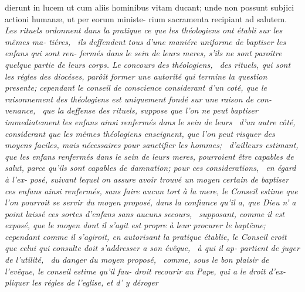 \documentclass{article}
\begin{document}
\newpage
\bgroup\fontsize{9.6}{13}\selectfont\noindent
dierunt in lucem ut cum aliis hominibus\break
vitam ducant; unde non possunt subjici\break
actioni humanæ, ut per eorum ministe-\break
rium sacramenta recipiant ad salutem.\break
\fontsize{9.6}{13}\selectfont\itshape Les rituels ordonnent dans la
pratique ce que\break
les théologiens ont établi sur les mêmes ma-\break
tiéres, \et\  ils deffendent tous d’une maniére\break
uniforme de baptiser les enfans qui sont ren-\break
fermés dans le sein de leurs meres, s’ils ne\break
sont paroître quelque partie de leurs corps.\break 
Le concours des théologiens, \et\  des rituels,\break
qui sont les régles des diocéses, parôit former\break
une autorité qui termine la question presente\textnormal{;}\break
cependant le conseil de conscience considerant\break
d’un coté, que le raisonnement des théologiens\break
est uniquement fondé sur une raison de con-\break
venance, \et\  que la deffense des rituels, suppose\break
que l’on ne peut baptiser immediatement les\break
enfans ainsi renfermés dans le sein de leurs\break
{}\break
\et\  d’un autre côté, considerant que les mêmes
théologiens enseignent, que l’on peut risquer\break
{}\break
des moyens faciles, mais nécessaires pour\break 
sanctifier les hommes; \et\  d’ailleurs estimant,\break
que les enfans renfermés dans le sein de leurs\break
meres, pourroient être capables de salut,\break
parce qu’ils sont capables de damnation\textnormal{;}\tsk\break  
pour ces considerations, \et\  en égard à l’ex-\break
posé, suivant lequel on assure avoir trouvé\break
un moyen certain de baptiser ces enfans ainsi\break
renfermés, sans faire aucun tort à la mere,\break
le Conseil estime que l’on pourroit se servir du\break
moyen proposé, dans la confiance qu’il a, que\break
Dieu n’ a point laissé ces sortes d’enfans\break
sans aucuns secours, \et\  supposant, comme\break
il est exposé, que le moyen dont il s’agit est\break
propre à leur procurer le baptême\textnormal{;} cependant\break
comme il s’agiroit, en autorisant la pratique\break
{}\break
établie, le Conseil croit que celui qui consulte\break
doit s’addresser a son évêque, \et\  à qui il ap-
partient de juger de l’utilité, \et\  du danger\break
du moyen proposé, \et\  comme, sous le bon\break
plaisir de l’evêque, le conseil estime qu’il fau-\break
droit recourir au Pape, qui a le droit d’ex-\break
pliquer les régles de l’eglise, et d’ y déroger\break
\end{document}
